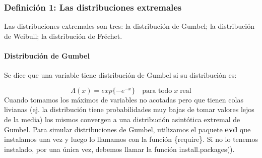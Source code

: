 \documentclass[
  12pt]{article}
\begin{document}
\newpage

\hypertarget{definiciuxf3n-1-las-distribuciones-extremales}{%
\subsubsection{Definición 1: Las distribuciones
extremales}\label{definiciuxf3n-1-las-distribuciones-extremales}}

Las distribuciones extremales son tres: la distribución de Gumbel; la
distribución de Weibull; la distribución de Fréchet.

\hypertarget{distribuciuxf3n-de-gumbel}{%
\paragraph{Distribución de Gumbel}\label{distribuciuxf3n-de-gumbel}}

Se dice que una variable tiene distribución de Gumbel si su distribución
es:

\[ \Lambda(x) = exp\{-e^{-x}\} \quad\text{para todo}\; x \;\text{real} \]
Cuando tomamos los máximos de variables no acotadas pero que tienen
colas livianas (ej. la distribución tiene probabilidades muy bajas de
tomar valores lejos de la media) los mismos convergen a una distribución
asintótica extremal de Gumbel. Para simular distribuciones de Gumbel,
utilizamos el paquete \textbf{evd} que instalamos una vez y luego lo
llamamos con la función \{require\}. Si no lo tenemos instalado, por una
única vez, debemos llamar la función install.packages().
\end{document}
